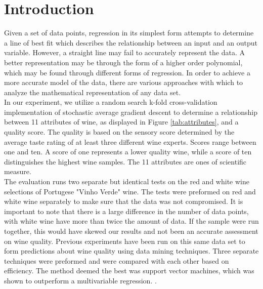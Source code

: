 
\section{Introduction}
\label{sec:intro}

Given a set of data points, regression in its simplest form attempts to 
determine a line of best fit which describes the relationship between an
input and an output variable. However, a straight line may fail to
accurately represent the data. A better representation may be through
the form of a higher order polynomial, which may be found through different
forms of regression. In order to achieve a more accurate model of the data,
there are various approaches with which to analyze the mathematical
representation of any data set.\\

In our experiment, we utilize a random search k-fold cross-validation implementation of stochastic
average gradient descent to determine a relationship between 11 attributes of wine,
as displayed in Figure \ref{tab:attributes}, and a quality score. The quality is based on the sensory score determined by the average taste rating of at least three different wine experts. Scores range between one and ten. A score of one represents a lower quality wine, while a score of ten distinguishes the highest wine samples. The 11 attributes are ones of scientific measure.\\

The evaluation runs two separate but identical tests on the red and white wine 
selections of Portugese "Vinho Verde" wine. The tests were preformed on red and white wine separately to make sure that the data was not compromised. It is important to note that there is a large difference in the number of data points, with white wine have more than twice the amount of data. If the sample were run together, this would have skewed our results and not been an accurate assessment on wine quality. Previous experiments have been run on this same data set to form predictions about wine quality using data mining techniques. Three separate techniques were preformed and were compared with each other based on efficiency. The method deemed 
the best was support vector machines, which was shown to outperform a multivariable regression. \cite{datamining}. \\

